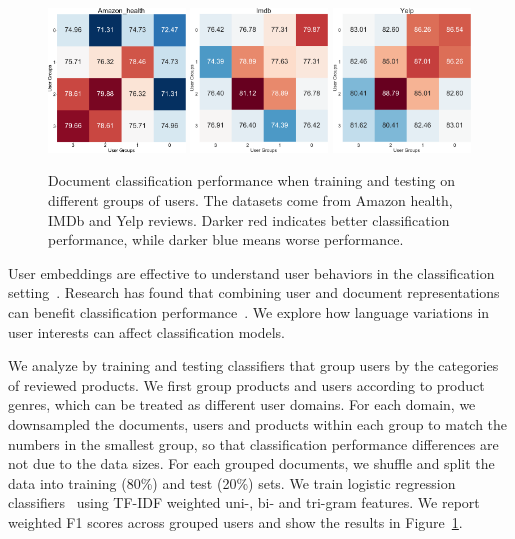 \begin{figure}[t]
\centering
\includegraphics[width=0.325\textwidth]{./images/chapter4/uembedding/amazon_health_group.pdf}
\includegraphics[width=0.325\textwidth]{./images/chapter4/uembedding/imdb_group.pdf}
\includegraphics[width=0.325\textwidth]{./images/chapter4/uembedding/yelp_group.pdf}
\caption{Document classification performance when training and testing on different groups of users. The datasets come from Amazon health, IMDb and Yelp reviews. Darker red indicates better classification performance, while darker blue means worse performance.}
\label{chap4:fig:group}
\end{figure}

User embeddings are effective to understand user behaviors in the classification setting~\cite{amir2016modelling, ding2018predicting}.
Research has found that combining user and document representations can benefit classification performance~\cite{yuan2019neural}.
We explore how language variations in user interests can affect classification models.

We analyze by training and testing classifiers that group users by the categories of reviewed products.
We first group products and users according to product genres, which can be treated as different user domains. 
For each domain, we downsampled the documents, users and products within each group to match the numbers in the smallest group, so that classification performance differences are not due to the data sizes.
For each grouped documents, we shuffle and split the data into training (80\%) and test (20\%) sets. We train logistic regression classifiers~\cite{pedregosa2011scikit} using TF-IDF weighted uni-, bi- and tri-gram features. 
We report weighted F1 scores across grouped users and show the results in Figure~\ref{chap4:fig:group}.

